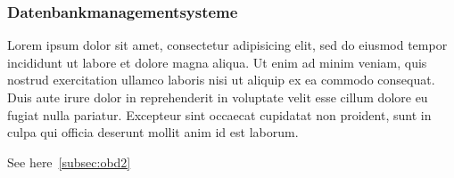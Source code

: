 \subsubsection{Datenbankmanagementsysteme}
\label{subsec:dbms}

Lorem ipsum dolor sit amet, consectetur adipisicing elit, sed do eiusmod
tempor incididunt ut labore et dolore magna aliqua. Ut enim ad minim veniam,
quis nostrud exercitation ullamco laboris nisi ut aliquip ex ea commodo
consequat. Duis aute irure dolor in reprehenderit in voluptate velit esse
cillum dolore eu fugiat nulla pariatur. Excepteur sint occaecat cupidatat non
proident, sunt in culpa qui officia deserunt mollit anim id est laborum.


See here~\ref{subsec:obd2}

\clearpage %